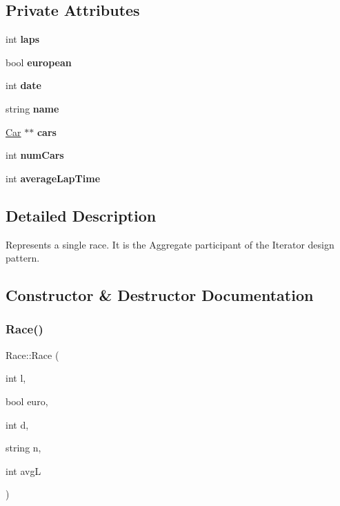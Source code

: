 \subsection*{Private Attributes}
\begin{DoxyCompactItemize}
\item 
\mbox{\label{classRace_afe9105279db6bf9863c4c251e5a4b7c2}} 
int {\bfseries laps}
\item 
\mbox{\label{classRace_a21de91e1163306dc0fac17d3714918c3}} 
bool {\bfseries european}
\item 
\mbox{\label{classRace_a16075783ff3af55b7ebf76d976302178}} 
int {\bfseries date}
\item 
\mbox{\label{classRace_aaa2d7a8eaf969f0a4f91fc1b49184458}} 
string {\bfseries name}
\item 
\mbox{\label{classRace_a4a037bea1b066e953e739e58700e6cfb}} 
\hyperlink{classCar}{Car} $\ast$$\ast$ {\bfseries cars}
\item 
\mbox{\label{classRace_ab365dd351b206397bb2a57f55197e12e}} 
int {\bfseries num\+Cars}
\item 
\mbox{\label{classRace_a99c047fd418cb7d320f116c5609eb86e}} 
int {\bfseries average\+Lap\+Time}
\end{DoxyCompactItemize}


\subsection{Detailed Description}
Represents a single race. It is the Aggregate participant of the Iterator design pattern. 

\subsection{Constructor \& Destructor Documentation}
\mbox{\label{classRace_aac8d492b10c760c0fb0a5e0b0e013dca}} 
\subsubsection{\texorpdfstring{Race()}{Race()}}
{\footnotesize\ttfamily Race\+::\+Race (\begin{DoxyParamCaption}\item[{int}]{l,  }\item[{bool}]{euro,  }\item[{int}]{d,  }\item[{string}]{n,  }\item[{int}]{avgL }\end{DoxyParamCaption})}


